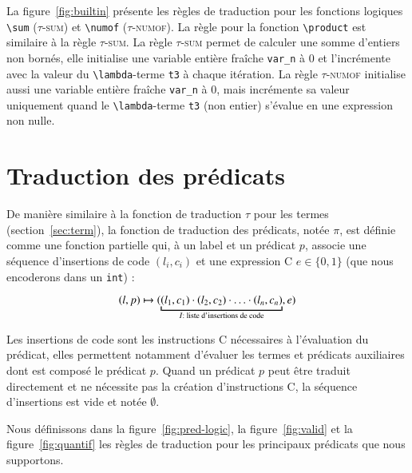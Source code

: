 La figure~\ref{fig:builtin} présente les règles de traduction pour les fonctions
logiques \lstinline|\sum| (\textsc{$\tau$-sum}) et \lstinline|\numof|
(\textsc{$\tau$-numof}).
La règle pour la fonction \lstinline|\product| est similaire à la règle
\textsc{$\tau$-sum}.
La règle \textsc{$\tau$-sum} permet de calculer une somme d'entiers non bornés,
elle initialise une variable entière fraîche \lstinline|var_n| à $0$ et
l'incrémente avec la valeur du \lstinline|\lambda|-terme \lstinline't3' à chaque
itération.
La règle \textsc{$\tau$-numof} initialise aussi une variable entière fraîche
\lstinline|var_n| à $0$, mais incrémente sa valeur uniquement quand le
\lstinline|\lambda|-terme \lstinline't3' (non entier) s'évalue en une expression
non nulle.


\section{Traduction des prédicats \eacsl}
\label{sec:pred}


De manière similaire à la fonction de traduction $\tau$ pour les termes
(section~\ref{sec:term}), la fonction de traduction des prédicats, notée $\pi$,
est définie comme une fonction partielle qui, à un label et un prédicat \eacsl
$p$, associe une séquence d'insertions de code $(l_i, c_i)$ et une expression C
$e \in \{0, 1\}$ (que nous encoderons dans un \lstinline'int') :

\[
(l, p) \rulearrow (\underbracket{(l_1, c_1) \concat (l_2, c_2) \concat \ldots
  \concat (l_n, c_n)}_{I : \text{ liste d'insertions de code}}, e)
\]

Les insertions de code sont les instructions C nécessaires à l'évaluation du
prédicat, elles permettent notamment d'évaluer les termes et prédicats
auxiliaires dont est composé le prédicat $p$.
Quand un prédicat $p$ peut être traduit directement et ne nécessite pas la
création d'instructions C, la séquence d'insertions est vide et notée
$\emptyset$.

Nous définissons dans la figure~\ref{fig:pred-logic}, la figure~\ref{fig:valid}
et la figure~\ref{fig:quantif} les règles de traduction pour les principaux
prédicats \eacsl que nous supportons.

